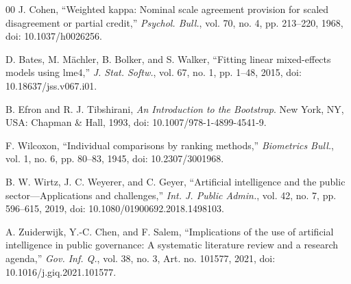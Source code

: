 \begin{thebibliography}{00}
 J. Cohen, ``Weighted kappa: Nominal scale agreement provision for scaled disagreement or partial credit,'' \emph{Psychol. Bull.}, vol. 70, no. 4, pp. 213--220, 1968, doi: 10.1037/h0026256.


 D. Bates, M. M{\"a}chler, B. Bolker, and S. Walker, ``Fitting linear mixed-effects models using lme4,'' \emph{J. Stat. Softw.}, vol. 67, no. 1, pp. 1--48, 2015, doi: 10.18637/jss.v067.i01.

 B. Efron and R. J. Tibshirani, \emph{An Introduction to the Bootstrap}. New York, NY, USA: Chapman \& Hall, 1993, doi: 10.1007/978-1-4899-4541-9.

 F. Wilcoxon, ``Individual comparisons by ranking methods,'' \emph{Biometrics Bull.}, vol. 1, no. 6, pp. 80--83, 1945, doi: 10.2307/3001968.


 B. W. Wirtz, J. C. Weyerer, and C. Geyer, ``Artificial intelligence and the public sector---Applications and challenges,'' \emph{Int. J. Public Admin.}, vol. 42, no. 7, pp. 596--615, 2019, doi: 10.1080/01900692.2018.1498103.

 A. Zuiderwijk, Y.-C. Chen, and F. Salem, ``Implications of the use of artificial intelligence in public governance: A systematic literature review and a research agenda,'' \emph{Gov. Inf. Q.}, vol. 38, no. 3, Art. no. 101577, 2021, doi: 10.1016/j.giq.2021.101577.


\end{thebibliography}

